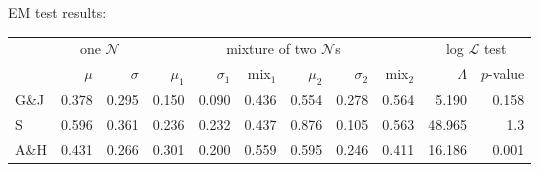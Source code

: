 \begin{example}
EM test results:

\vspace{0.5\baselineskip}
\begin{tabular}{l | r r | r r r r r r | r r}
\toprule
     & \multicolumn{2}{c|}{one $\mathcal{N}$} & \multicolumn{6}{c|}{mixture of two $\mathcal{N}$s} & \multicolumn{2}{c}{log $\mathcal{L}$ test} \\
     & $\mu$ & $\sigma$ & $\mu_1$ & $\sigma_1$ & mix$_1$ & $\mu_2$ & $\sigma_2$ & mix$_2$ & $\Lambda$ & $p$-value  \\
\midrule
G\&J & 0.378 & 0.295    & 0.150   & 0.090      & 0.436     & 0.554   & 0.278    & 0.564     & 5.190    & 0.158   \\
S    & 0.596 & 0.361    & 0.236   & 0.232      & 0.437     & 0.876   & 0.105    & 0.563 & 48.965    & 1.3\e{-10} \\
A\&H & 0.431 & 0.266    & 0.301   & 0.200      & 0.559     & 0.595   & 0.246    & 0.411 & 16.186    & 0.001      \\
\bottomrule
\end{tabular}
\end{example}


